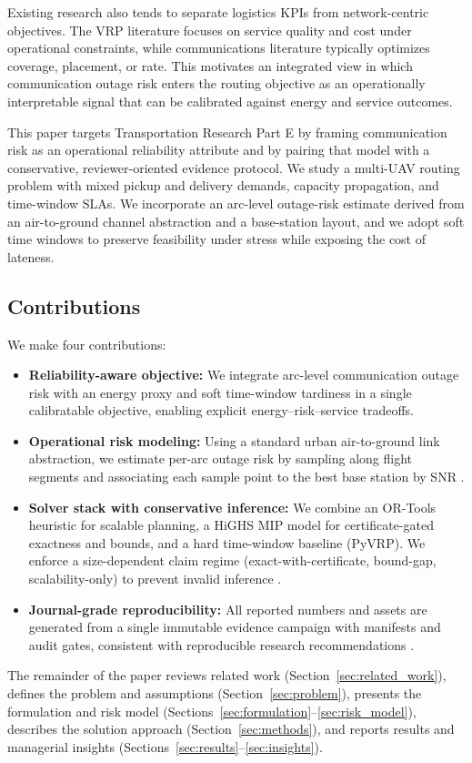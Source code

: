 Existing research also tends to separate logistics KPIs from network-centric objectives. The VRP literature focuses on service quality and cost under operational constraints, while communications literature typically optimizes coverage, placement, or rate. This motivates an integrated view in which communication outage risk enters the routing objective as an operationally interpretable signal that can be calibrated against energy and service outcomes.

This paper targets Transportation Research Part E by framing communication risk as an operational reliability attribute and by pairing that model with a conservative, reviewer-oriented evidence protocol. We study a multi-UAV routing problem with mixed pickup and delivery demands, capacity propagation, and time-window SLAs. We incorporate an arc-level outage-risk estimate derived from an air-to-ground channel abstraction and a base-station layout, and we adopt soft time windows to preserve feasibility under stress while exposing the cost of lateness.

\subsection*{Contributions}
We make four contributions:
\begin{itemize}[leftmargin=*]
\item \textbf{Reliability-aware objective:} We integrate arc-level communication outage risk with an energy proxy and soft time-window tardiness in a single calibratable objective, enabling explicit energy--risk--service tradeoffs.
\item \textbf{Operational risk modeling:} Using a standard urban air-to-ground link abstraction, we estimate per-arc outage risk by sampling along flight segments and associating each sample point to the best base station by SNR \citep{alhourani2014,zeng2016}.
\item \textbf{Solver stack with conservative inference:} We combine an OR-Tools heuristic for scalable planning, a HiGHS MIP model for certificate-gated exactness and bounds, and a hard time-window baseline (PyVRP). We enforce a size-dependent claim regime (exact-with-certificate, bound-gap, scalability-only) to prevent invalid inference \citep{highs,ortools,pyvrp}.
\item \textbf{Journal-grade reproducibility:} All reported numbers and assets are generated from a single immutable evidence campaign with manifests and audit gates, consistent with reproducible research recommendations \citep{peng2011,stodden2016}.
\end{itemize}



The remainder of the paper reviews related work (Section~\ref{sec:related_work}), defines the problem and assumptions (Section~\ref{sec:problem}), presents the formulation and risk model (Sections~\ref{sec:formulation}--\ref{sec:risk_model}), describes the solution approach (Section~\ref{sec:methods}), and reports results and managerial insights (Sections~\ref{sec:results}--\ref{sec:insights}).
